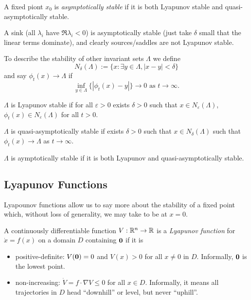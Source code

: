 \documentclass[a4paper]{article}
\begin{document}
\begin{defi}
  A fixed piont \(x_0\) is \emph{asymptotically stable} if it is both Lyapunov stable and quasi-asymptotically stable.
\end{defi}

\begin{eg}
  A sink (all \(\lambda_i\) have \(\Re \lambda_i<0\)) is asymptotically stable (just take \(\delta\) small that the linear terms dominate), and clearly sources/saddles are not Lyapunov stable.
\end{eg}

To describe the stability of other invariant sets \(\Lambda\) we define
\[
  N_\delta(\Lambda) := \{x: \exists y\in\Lambda, |x-y|<\delta \}
\]
and say \(\phi_t(x)\to \Lambda\) if
\[
  \inf_{y\in \Lambda}\{|\phi_t(x)-y|\}\to 0 \text{ as } t\to \infty.
\]

\begin{defi}
  \(\Lambda\) is Lyapunov stable if for all \(\varepsilon>0\) exists \(\delta>0\) such that \(x\in N_\varepsilon(\Lambda)\), \(\phi_t(x) \in N_\varepsilon(\Lambda)\) for all \(t>0\).

  \(\Lambda\) is quasi-asymptotically stable if exists \(\delta>0\) such that \(x\in N_\delta(\Lambda)\) such that \(\phi_t(x)\to \Lambda\) as \(t\to \infty\).

  \(\Lambda\) is aymptotically stable if it is both Lyapunov and quasi-asymptotically stable.
\end{defi}

\subsection{Lyapunov Functions}

Lyapounov functions allow us to say more about the stability of a fixed point which, without loss of generality, we may take to be at \(x=0\).

\begin{defi}
  A continuously differentiable function \(V:\R^n\to \R\) is a \emph{Lyapunov function} for \(\dot{x} = f(x)\) on a domain \(D\) containing \(\mathbf{0}\) if it is
  \begin{itemize}
  \item positive-definite: \(V(\mathbf{0}) = 0\) and \(V(x) >0\) for all \(x\neq 0\) in \(D\). Informally, \(\mathbf{0}\) is the lowest point.
  \item non-increasing: \(\dot{V} = f\cdot\nabla V \leq 0\) for all \(x\in D\). Informally, it means all trajectories in \(D\) head ``downhill'' or level, but never ``uphill''.
  \end{itemize}
\end{defi}
\end{document}
